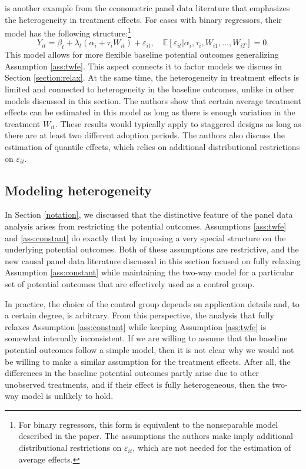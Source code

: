 \documentclass[letterpaper,12pt,leqno]{article}
\begin{document}
\citep{chernozhukov2013average} is another example from the econometric panel data literature that emphasizes the heterogeneity in treatment effects. For cases with binary regressors, their model  has the following structure:\footnote{For binary regressors, this form is equivalent to the nonseparable model described in the paper. The assumptions the authors make imply additional distributional restrictions on $\varepsilon_{it}$, which are not needed for the estimation of average effects.}
\begin{equation*}
    Y_{it} = \beta_t + \lambda_t\left(\alpha_i + \tau_i W_{it}\right) + \varepsilon_{it}, \quad \mathbb{E}[\varepsilon_{it}|\alpha_i, \tau_i, W_{i1},\dots, W_{iT}] = 0.  
\end{equation*}
This model allows for more flexible baseline potential outcomes generalizing Assumption \ref{ass:twfe}. This aspect connects it to factor models we discuss in Section \ref{section:relax}. At the same time, the heterogeneity in treatment effects is limited and connected to heterogeneity in the baseline outcomes, unlike in other models discussed in this section.  The authors show that certain average treatment effects can be estimated in this model as long as there is enough variation in the treatment $W_{it}$. These results would typically apply to staggered designs as long as there are at least two different adoption periods. The authors also discuss the estimation of quantile effects, which relies on additional distributional restrictions on $\varepsilon_{it}$.

\subsection{Modeling heterogeneity}
In Section \ref{notation}, we discussed that the distinctive feature of the panel data analysis arises from restricting the potential outcomes. Assumptions \ref{ass:twfe} and \ref{ass:constant} do exactly that by imposing a very special structure on the underlying potential outcomes. Both of these assumptions are restrictive, and the new causal panel data literature discussed in this section focused on fully relaxing Assumption \ref{ass:constant} while maintaining the two-way model for a particular set of potential outcomes that are effectively used as a control group.

In practice, the choice of the control group depends on application details and, to a certain degree, is arbitrary. From this perspective, the analysis that fully relaxes Assumption \ref{ass:constant} while keeping Assumption \ref{ass:twfe} is somewhat internally inconsistent. If we are willing to assume that the baseline potential outcomes follow a simple model, then it is not clear why we would not be willing to make a similar assumption for the treatment effects. After all, the differences in the baseline potential outcomes partly arise due to other unobserved treatments, and if their effect is fully heterogeneous, then the two-way model is unlikely to hold. 
\end{document}
